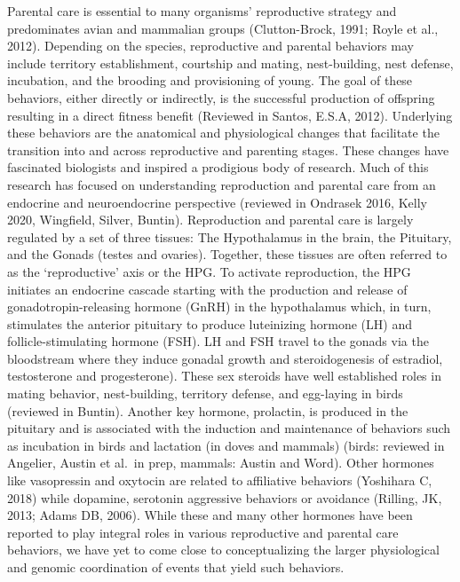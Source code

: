 Parental care is essential to many organisms' reproductive strategy and
predominates avian and mammalian groups (Clutton-Brock, 1991; Royle et
al., 2012). Depending on the species, reproductive and parental
behaviors may include territory establishment, courtship and mating,
nest-building, nest defense, incubation, and the brooding and
provisioning of young. The goal of these behaviors, either directly or
indirectly, is the successful production of offspring resulting in a
direct fitness benefit (Reviewed in Santos, E.S.A, 2012). Underlying
these behaviors are the anatomical and physiological changes that
facilitate the transition into and across reproductive and parenting
stages. These changes have fascinated biologists and inspired a
prodigious body of research. Much of this research has focused on
understanding reproduction and parental care from an endocrine and
neuroendocrine perspective (reviewed in Ondrasek 2016, Kelly 2020,
Wingfield, Silver, Buntin). Reproduction and parental care is largely
regulated by a set of three tissues: The Hypothalamus in the brain, the
Pituitary, and the Gonads (testes and ovaries). Together, these tissues
are often referred to as the `reproductive' axis or the HPG. To activate
reproduction, the HPG initiates an endocrine cascade starting with the
production and release of gonadotropin-releasing hormone (GnRH) in the
hypothalamus which, in turn, stimulates the anterior pituitary to
produce luteinizing hormone (LH) and follicle-stimulating hormone (FSH).
LH and FSH travel to the gonads via the bloodstream where they induce
gonadal growth and steroidogenesis of estradiol, testosterone and
progesterone). These sex steroids have well established roles in mating
behavior, nest-building, territory defense, and egg-laying in birds
(reviewed in Buntin). Another key hormone, prolactin, is produced in the
pituitary and is associated with the induction and maintenance of
behaviors such as incubation in birds and lactation (in doves and
mammals) (birds: reviewed in Angelier, Austin et al.~in prep, mammals:
Austin and Word). Other hormones like vasopressin and oxytocin are
related to affiliative behaviors (Yoshihara C, 2018) while dopamine,
serotonin aggressive behaviors or avoidance (Rilling, JK, 2013; Adams
DB, 2006). While these and many other hormones have been reported to
play integral roles in various reproductive and parental care behaviors,
we have yet to come close to conceptualizing the larger physiological
and genomic coordination of events that yield such behaviors.

